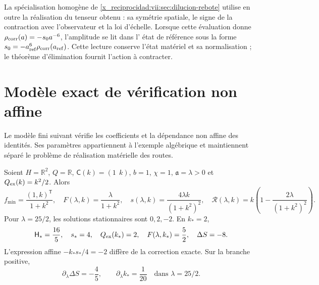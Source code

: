 La spécialisation homogène de
\ref{x_reciprocidad:vii:sec:dilucion-rebote} utilise en outre la réalisation du
tenseur obtenu : sa symétrie spatiale, le signe de la contraction
avec l'observateur et la loi d'échelle. Lorsque cette évaluation donne
\(\rho_{\rm corr}(a)=-s_0a^{-6}\), l'amplitude se lit dans l'
état de référence sous la forme
\(s_0=-a_{\rm ref}^{6}\rho_{\rm corr}(a_{\rm ref})\).
Cette lecture conserve l'état matériel et sa normalisation ; le
théorème d'élimination fournit l'action à contracter.

\section{Modèle exact de vérification non affine}
\label{x_reciprocidad:vii:subsec:control-no-afin}

Le modèle fini suivant vérifie les coefficients et la dépendance non affine des identités. Ses paramètres appartiennent à l'exemple algébrique et maintiennent séparé le problème de réalisation matérielle des routes.

\begin{proposition}
\label{x_reciprocidad:vii:prop:ejemplo-no-afin}
Soient \(H=\mathbb R^2\), \(Q=\mathbb R\), \(\mathsf C(k)=(1\ \ k)\), \(b=1\), \(\chi=1\), \(\mathfrak a=\lambda>0\) et \(Q_{\rm ex}(k)=k^2/2\). Alors
\begin{equation}
 f_{\min}=\frac{(1,k)^{\mathsf T}}{1+k^2},\quad
 F(\lambda,k)=\frac{\lambda}{1+k^2},\quad
 s(\lambda,k)=\frac{4\lambda k}{(1+k^2)^2},\quad
 \mathcal R(\lambda,k)
    =k\left(1-\frac{2\lambda}{(1+k^2)^2}\right).
 \label{x_reciprocidad:vii:eq:ejemplo-minimo-no-afin}
\end{equation}
Pour \(\lambda=25/2\), les solutions stationnaires sont
\(0,2,-2\). En \(k_*=2\),
\begin{equation}
 \mathsf H_*=\frac{16}{5},\quad s_*=4,\quad
 Q_{\rm ex}(k_*)=2,\quad F(\lambda,k_*)=\frac52,
 \quad \Delta S=-8.
 \label{x_reciprocidad:vii:eq:valores-ejemplo-no-afin}
\end{equation}
L'expression affine \(-k_*s_*/4=-2\) diffère de la correction
exacte. Sur la branche positive,
\begin{equation}
 \partial_\lambda\Delta S=-\frac45,
 \qquad \partial_\lambda k_* =\frac1{20}
 \quad\text{dans }\lambda=25/2.
 \label{x_reciprocidad:vii:eq:derivadas-ejemplo-no-afin}
\end{equation}
\end{proposition}

